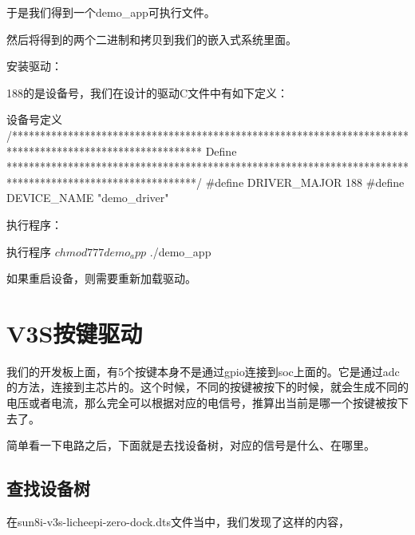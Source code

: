 \documentclass[lang=cn,newtx,10pt,scheme=chinese]{elegantbook}
\begin{document}
于是我们得到一个demo\_app可执行文件。

然后将得到的两个二进制和拷贝到我们的嵌入式系统里面。

安装驱动：


188的是设备号，我们在设计的驱动C文件中有如下定义：

\begin{mycode}{设备号定义}
/**********************************************************************************************************
Define
**********************************************************************************************************/
#define    DRIVER_MAJOR     188
#define    DEVICE_NAME     "demo_driver"
\end{mycode}

执行程序：

\begin{mycode}{执行程序}
$ chmod 777 demo_app
$ ./demo_app
\end{mycode}

\begin{marker}
    如果重启设备，则需要重新加载驱动。
\end{marker}

\chapter{V3S按键驱动}

我们的开发板上面，有5个按键本身不是通过gpio连接到soc上面的。它是通过adc的方法，连接到主芯片的。这个时候，不同的按键被按下的时候，就会生成不同的电压或者电流，那么完全可以根据对应的电信号，推算出当前是哪一个按键被按下去了。

简单看一下电路之后，下面就是去找设备树，对应的信号是什么、在哪里。

\section{查找设备树}

在sun8i-v3s-licheepi-zero-dock.dts文件当中，我们发现了这样的内容，
\end{document}
